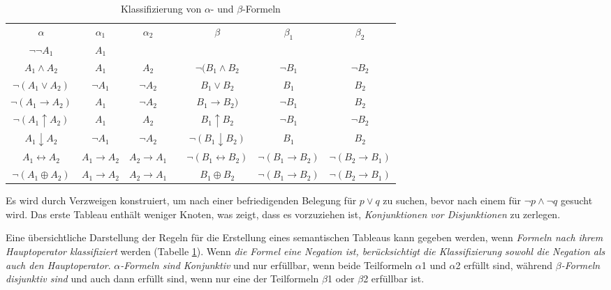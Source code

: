 \begin{table}[h]
\footnotesize
	\begin{center}
			\begin{tabular}{ccccccc}
			\cline{1-3}
			\cline{5-7}
			$\alpha$  & $\alpha_1$ & $\alpha_2$ &   &$\beta$&$\beta_1$&$\beta_2$  \\
			\cline{1-3} 
			\cline{5-7}
			
			$\neg \neg A_1$  & $A_1$ &  &   &&& \\
			
			$A_1 \wedge A_2$  & $A_1$ & $A_2$ &   &$\neg (B_1 \wedge B_2$&$\neg B_1$&$\neg B_2$  \\
			
			$\neg (A_1 \vee A_2)$  & $\neg A_1$ & $\neg A_2$ &   &$B_1 \vee B_2 $&$B_1$&$B_2$  \\
			
			$\neg (A_1 \rightarrow A_2)$  & $A_1$ & $\neg A_2$ &   &$B_1 \rightarrow B_2)$&$\neg B_1$&$B_2$  \\
			
			$\neg(A_1 \uparrow A_2)$  & $A_1$ & $A_2$ &   &$B_1 \uparrow B_2$&$\neg B_1$&$\neg B_2$  \\
			
			$A_1 \downarrow A_2$  & $\neg A_1$ & $\neg A_2$ &   &$\neg (B_1 \downarrow B_2)$&$B_1$&$B_2$  \\
			
			$A_1 \leftrightarrow A_2$  & $A_1 \rightarrow A_2$ & $A_2 \rightarrow A_1$ &   &$\neg (B_1 \leftrightarrow B_2)$&$\neg (B_1 \rightarrow B_2)$&$\neg (B_2 \rightarrow B_1)$  \\
			
			$\neg (A_1 \oplus A_2)$  & $A_1 \rightarrow A_2$ & $A_2 \rightarrow A_1$ &   &$B_1 \oplus B_2$&$\neg (B_1 \rightarrow B_2)$&$\neg (B_2 \rightarrow B_1)$  \\
			\cline{1-3} 
			\cline{5-7}
			\end{tabular}
	\end{center}
	\caption[$\alpha$- und $\beta$-Formeln]{Klassifizierung von $\alpha$- und $\beta$-Formeln}
	\label{Abb. 2.8}
\end{table}			

Es wird durch Verzweigen konstruiert, um nach einer befriedigenden Belegung für $p \vee q$ zu suchen, bevor nach einem für $\neg p \wedge \neg q$ gesucht wird. Das erste Tableau enthält weniger Knoten, was zeigt, dass es vorzuziehen ist, \textit{Konjunktionen vor Disjunktionen} zu zerlegen.

Eine übersichtliche Darstellung der Regeln für die Erstellung eines semantischen Tableaus kann gegeben werden, wenn \textit{Formeln nach ihrem Hauptoperator klassifiziert} werden (Tabelle \ref{Abb. 2.8}). Wenn \textit{die Formel eine Negation ist, berücksichtigt die Klassifizierung sowohl die Negation als auch den Hauptoperator}. \textit{$\alpha$-Formeln sind Konjunktiv} und nur erfüllbar, wenn beide Teilformeln $\alpha$1 und $\alpha$2 erfüllt sind, während \textit{$\beta$-Formeln disjunktiv sind} und auch dann erfüllt sind, wenn nur eine der Teilformeln $\beta$1 oder $\beta$2 erfüllbar ist.

